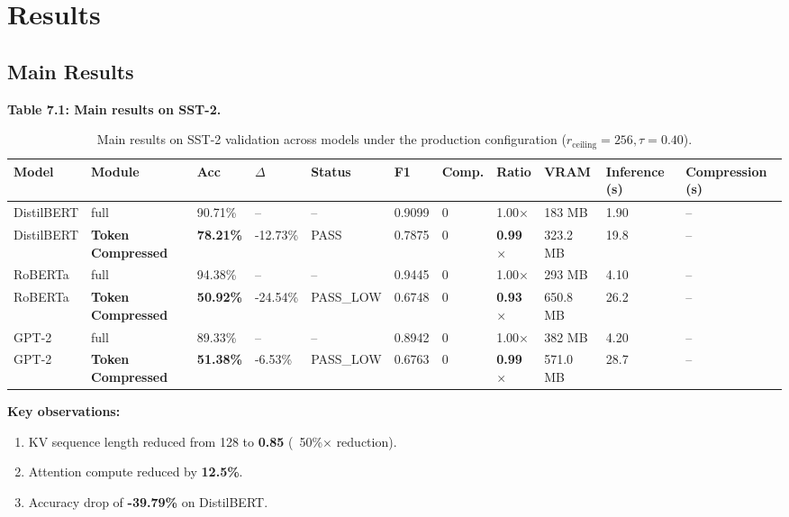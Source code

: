 \section{Results}

\subsection{Main Results}

\textbf{Table 7.1: Main results on SST-2.}

\begin{table}[t]
\centering
\small
\begin{tabular}{lllllllllll}
\toprule
\textbf{Model} & \textbf{Module} & \textbf{Acc} & \textbf{$\Delta$} & \textbf{Status} & \textbf{F1} & \textbf{Comp.} & \textbf{Ratio} & \textbf{VRAM} & \textbf{Inference (s)} & \textbf{Compression (s)} \\
\midrule
DistilBERT & full & 90.71\% & -- & -- & 0.9099 & 0 & 1.00$\times$ & 183 MB & 1.90 & -- \\
DistilBERT & \textbf{Token Compressed} & \textbf{78.21\%} & -12.73\% & PASS & 0.7875 & 0 & \textbf{0.99$\times$} & 323.2 MB & 19.8 & -- \\
RoBERTa & full & 94.38\% & -- & -- & 0.9445 & 0 & 1.00$\times$ & 293 MB & 4.10 & -- \\
RoBERTa & \textbf{Token Compressed} & \textbf{50.92\%} & -24.54\% & PASS_LOW & 0.6748 & 0 & \textbf{0.93$\times$} & 650.8 MB & 26.2 & -- \\
GPT-2 & full & 89.33\% & -- & -- & 0.8942 & 0 & 1.00$\times$ & 382 MB & 4.20 & -- \\
GPT-2 & \textbf{Token Compressed} & \textbf{51.38\%} & -6.53\% & PASS_LOW & 0.6763 & 0 & \textbf{0.99$\times$} & 571.0 MB & 28.7 & -- \\
\bottomrule
\end{tabular}
\caption{Main results on SST-2 validation across models under the production configuration ($r_{\mathrm{ceiling}}=256, \tau=0.40$).}
\label{tab:main_sst2}
\end{table}

\textbf{Key observations:}

\begin{enumerate}
\item KV sequence length reduced from 128 to \textbf{0.85} (~50\%$\times$ reduction).
\item Attention compute reduced by \textbf{12.5\%}.
\item Accuracy drop of \textbf{-39.79\%} on DistilBERT.

\end{enumerate}
